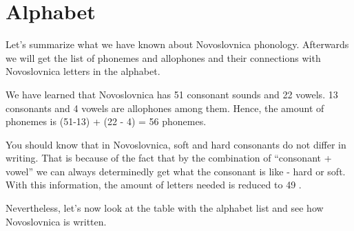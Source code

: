 \section{Alphabet}

Let’s summarize what we have known about Novoslovnica phonology. Afterwards we will get the list of phonemes and allophones and their connections with Novoslovnica letters in the alphabet.

We have learned that Novoslovnica has 51 consonant sounds and 22 vowels. 13 consonants and 4 vowels are allophones among them. Hence, the amount of phonemes is (51-13) + (22 - 4) = 56 phonemes.

You should know that in Novoslovnica, soft and hard consonants do not differ in writing. That is because of the fact that by the combination of “consonant + vowel” we can always determinedly get what the consonant is like - hard or soft. With this information, the amount of letters needed is reduced to 49 \cite{nsl-alphabet}.

Nevertheless, let’s now look at the table with the alphabet list and see how Novoslovnica is written.

